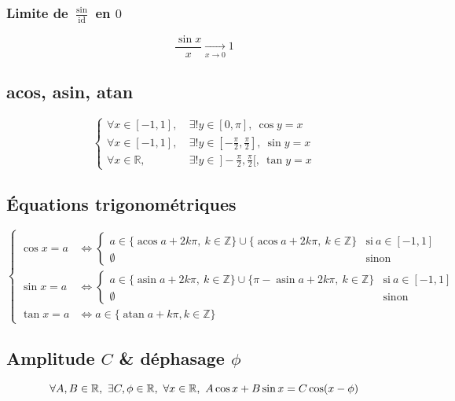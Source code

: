 \documentclass{article}
\newcommand{\R}{{\mathbb R}}
\newcommand{\Z}{{\mathbb Z}}
\newcommand{\id}{\operatorname{id}}
\begin{document}

\subsubsection{Limite de $ \frac{\sin}{\id}$ en $0$}

\[
	\frac{\sin x}{x} \xrightarrow[{x\to 0}]{}  1
\] 
\subsection{acos, asin, atan}

\[
	\begin{cases}
		\forall x \in [-1, 1],\ &\exists! y \in [0, \pi],\ \cos y = x\\
		\forall x \in [-1, 1],\ &\exists! y\in [-\frac{\pi}{2}, \frac{\pi}{2}],\ \sin y = x \\
		\forall x \in \R,\ &\exists! y\in\ ]\!-\!\frac{\pi}{2}, \frac{\pi}{2}[,\ \tan y = x
	\end{cases}
\] 

\subsection{Équations trigonométriques}
\[
	\begin{cases}
		\cos x = a &\iff
			\begin{cases}
				a \in \{\operatorname{acos} a + 2k\pi,\ k \in \Z\}
					\cup \{\operatorname{acos} a + 2k\pi,\ k\in \Z\}
					& \text{si}\  a \in [-1, 1]\ \\
				\emptyset & \text{sinon}
			\end{cases}\\
		\sin x = a &\iff \begin{cases}
				a \in \{\operatorname{asin} a + 2k\pi,\ k\in \Z\}
				\cup \{\pi - \operatorname{asin} a + 2k\pi,\ k\in \Z\}
				& \text{si}\ a \in [-1, 1] \\
			\emptyset & \text{sinon}
		\end{cases} \\
		\tan x = a &\iff a \in \{\operatorname{atan} a + k\pi, k \in \Z\} 
	\end{cases}
\] 

\subsection{Amplitude $C$ \& déphasage $\phi$}

\[
	\forall A, B \in \R,\ \exists C, \phi \in \R,\ \forall x \in \R,\ A\cos x + B \sin x = C \cos(x-\phi) \\
\] 
\end{document}
